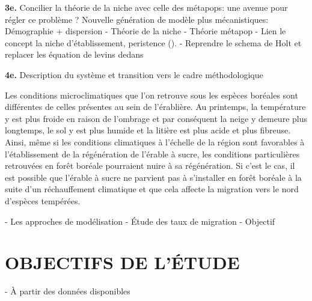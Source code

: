 \textbf{3e.}  Concilier la théorie de la niche avec celle des métapops: une avenue pour régler ce problème ?
	Nouvelle génération de modèle plus mécanistiques: Démographie + dispersion
- Théorie de la niche
- Théorie métapop
- Lien le concept la niche d'établissement, peristence ().
- Reprendre le schema de Holt et replacer les équation de levins dedans

\textbf{4e.}  Description du système et transition vers le cadre méthodologique

Les conditions microclimatiques que l’on retrouve sous les espèces boréales sont différentes de celles présentes au sein de l’érablière. Au printemps, la température y est plus froide en raison de l’ombrage et par conséquent la neige y demeure plus longtemps, le sol y est plus humide et la litière est plus acide et plus fibreuse. Ainsi, même si les conditions climatiques à l’échelle de la région sont favorables à l’établissement de la régénération de l’érable à sucre, les conditions particulières retrouvées en forêt boréale pourraient nuire à sa régénération. Si c’est le cas, il est possible que l’érable à sucre ne parvient pas à s’installer en forêt boréale à la suite d’un réchauffement climatique et que cela affecte la migration vers le nord d’espèces tempérées.

- Les approches de modélisation
- Étude des taux de migration
- Objectif 

\section*{\uppercase{OBJECTIFS DE L'ÉTUDE}}
- À partir des données disponibles